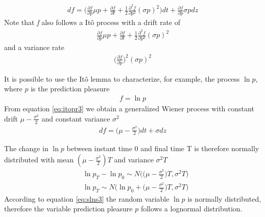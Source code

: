 \documentclass[11pt,twocolumn]{article}
\begin{document}
\begin{equation}
\begin{split}
   df = \bigg(\frac{\partial f}{\partial p} \mu p  + \frac{\partial f}{\partial t} + \frac{1}{2}\frac{\partial ^2 f}{\partial p^2} (\sigma p)^2 \bigg)dt + \frac{\partial f}{\partial p}\sigma p dz
\end{split}
\label{eq:itopr3}
\end{equation}
Note that \emph{f} also follows a It\^{o} process with a drift rate of 
\begin{equation}
\begin{split}
   \frac{\partial f}{\partial p} \mu p + \frac{\partial f}{\partial t} + \frac{1}{2}\frac{\partial ^2 f}{\partial p^2}  (\sigma p)^2 
\end{split}
\label{eq:driftito}
\end{equation}
and a variance rate 
\begin{equation}
\begin{split}
   \bigg( \frac{\partial f}{\partial p} \bigg)^2 (\sigma p)^2
\end{split}
\label{eq:driftito}
\end{equation}

It is possible to use the  It\^{o} lemma to characterize, for example, the process $\ln p$, where $p$ is the prediction pleasure
\begin{equation}
\begin{split}
  f = \ln p
\end{split}
\label{eq:slns}
\end{equation} 
From equation \ref{eq:itopr3} we obtain a generalized Wiener process with constant drift $\mu - \frac{\sigma^2}{2}$ and constant variance $\sigma^2$ 
\begin{equation*}
\begin{split}
df =  \bigg( \mu - \frac{\sigma^2}{2} \bigg)dt + \sigma dz
\end{split}
\label{eq:slns2}
\end{equation*} 

The change in $\ln p $ between instant time 0 and final time T is therefore normally distributed with mean $(\mu - \frac{\sigma^2}{2})T$ and variance $\sigma^2T$
\begin{equation}
\begin{split}
 & \ln p_T - \ln p_0 \sim N \bigg( \big(\mu - \frac{\sigma ^2}{2} \big) T, \sigma^2 T \bigg) \\
 & \ln p_T  \sim N \bigg( \ln p_0 + \big(\mu - \frac{\sigma ^2}{2} \big) T, \sigma^2 T \bigg) 
\end{split}
\label{eq:slns3}
\end{equation}
According to equation \ref{eq:slns3} the random variable $\ln p$ is normally distributed, therefore the variable  prediction pleasure $p$ follows a lognormal distribution. 
\end{document}
